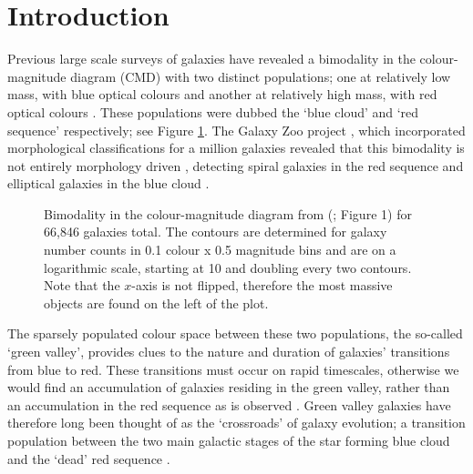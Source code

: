 \documentclass{mn2e}
\begin{document}
\section{Introduction}
Previous large scale surveys of galaxies have revealed a bimodality in the colour-magnitude diagram (CMD) with two distinct populations; one at relatively low mass, with blue optical colours and another at relatively high mass, with red optical colours \citep{Baldry04, Baldry06, Willmer06, BLB08, Brammer09}. These populations were dubbed the `blue cloud' and `red sequence' respectively; see Figure \ref{baldry}. The Galaxy Zoo project \citep{Lintott11}, which incorporated morphological classifications for a million galaxies revealed that this bimodality is not entirely morphology driven \citep{Bamford09, Skibba09}, detecting spiral galaxies in the red sequence \citep{Masters10} and elliptical galaxies in the blue cloud \citep{Sch09}.  

\begin{figure}
\caption{Bimodality in the colour-magnitude diagram from (\citealt{Baldry04}; Figure 1) for 66,846 galaxies total. The contours are determined for galaxy number counts in 0.1 colour x 0.5 magnitude bins and are on a logarithmic scale, starting at 10 and doubling every two contours. Note that the $x$-axis is not flipped, therefore the most massive objects are found on the left of the plot.}
\label{baldry}
\end{figure}


The sparsely populated colour space between these two populations, the so-called `green valley', provides clues to the nature and duration of galaxies' transitions from blue to red. These transitions must occur on rapid timescales, otherwise we would find an accumulation of galaxies residing in the green valley, rather than an accumulation in the red sequence as is observed \citep{Arnouts07, Martin07}. Green valley galaxies have therefore long been thought of as the `crossroads' of galaxy evolution; a transition population between the two main galactic stages of the star forming blue cloud and the `dead' red sequence \citep{Bell04, Wyder07, Schim07, Martin07, Faber07, Mendez11, Gonc12, Sch2014}. 
\end{document}
